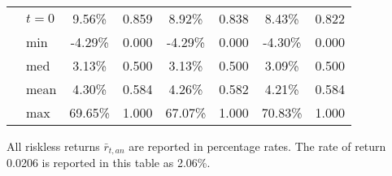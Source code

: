 \documentclass[letterpaper,12pt]{article}
\theoremstyle{definition}
\begin{document}
\begin{spacing}{1.5}
\begin{table}[htbp]
\begin{threeparttable}
\begin{tabular}{>{\small}c >{\small}l| >{\small}c >{\small}c| >{\small}c >{\small}c| >{\small}c >{\small}c}
      & $t=0$ & 9.56\% & 0.859 & 8.92\% & 0.838 & 8.43\% & 0.822 \\
      & min & -4.29\% & 0.000 & -4.29\% & 0.000 & -4.30\% & 0.000 \\
      & med & 3.13\% & 0.500 & 3.13\% & 0.500 & 3.09\% & 0.500 \\
      & mean & 4.30\% & 0.584 & 4.26\% & 0.582 & 4.21\% & 0.584 \\
      & max & 69.65\% & 1.000 & 67.07\% & 1.000 & 70.83\% & 1.000 \\
      \hline\hline
    \end{tabular}
    \begin{tablenotes}
      \scriptsize{\item[]All riskless returns $\bar{r}_{t,an}$ are reported in percentage rates. The rate of return 0.0206 is reported in this table as 2.06\%.}
    \end{tablenotes}
    \end{threeparttable}
  \end{table}


\end{spacing}
\end{document}
